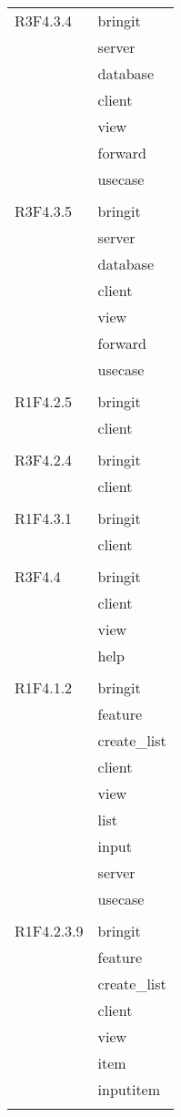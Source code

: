 \begin{center}
\begin{longtable}{|p{7cm}|p{7cm}|}
		R3F4.3.4 & bringit \\ & server \\ & database \\ & client \\ & view \\ & forward \\ & usecase \\ & \\ \hline
		R3F4.3.5 & bringit \\ & server \\ & database \\ & client \\ & view \\ & forward \\ & usecase \\ & \\ \hline
		R1F4.2.5 & bringit \\ & client \\ & \\ \hline
		R3F4.2.4 & bringit \\ & client \\ & \\ \hline
		R1F4.3.1 & bringit \\ & client \\ & \\ \hline
		R3F4.4 & bringit \\ & client \\ & view \\ & help \\ & \\ \hline
		R1F4.1.2 & bringit \\ & feature \\ & create\_list \\ & client \\ & view \\ & list \\ & input \\ & server \\ & usecase \\ & \\ \hline
		R1F4.2.3.9 & bringit \\ & feature \\ & create\_list \\ & client \\ & view \\ & item \\ & inputitem \\ & \\ \hline

\end{longtable}
\end{center}
